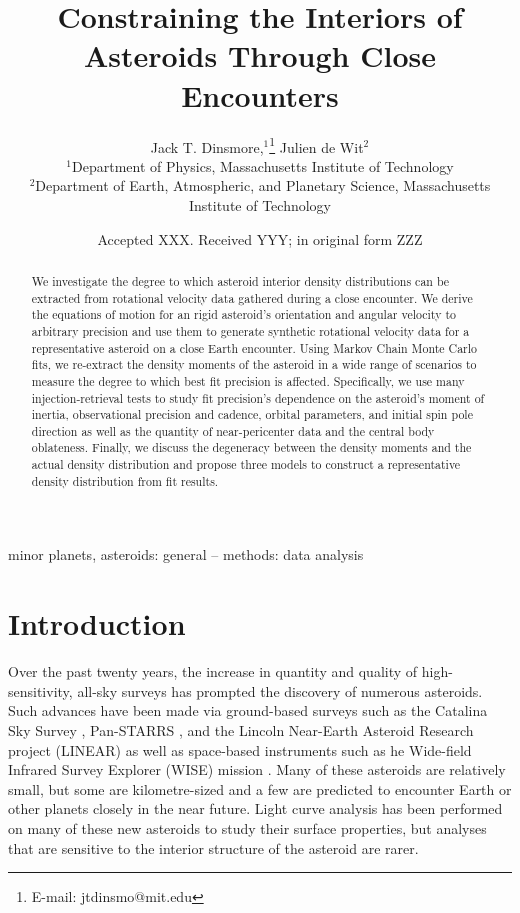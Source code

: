 \documentclass[fleqn,usenatbib]{mnras}
\title[Flyby Constraints on Asteroids Interiors]{Constraining the Interiors of Asteroids Through Close Encounters}
\author[Jack T. Dinsmore, Julien de Wit]{
Jack T. Dinsmore,$^{1}$\thanks{E-mail: jtdinsmo@mit.edu}
Julien de Wit$^{2}$
\\
$^{1}$Department of Physics, Massachusetts Institute of Technology\\
$^{2}$Department of Earth, Atmospheric, and Planetary Science, Massachusetts Institute of Technology
}
\date{Accepted XXX. Received YYY; in original form ZZZ}
\begin{document}
\label{firstpage}
\pagerange{\pageref{firstpage}--\pageref{lastpage}}
\maketitle

\begin{abstract}
  We investigate the degree to which asteroid interior density distributions can be extracted from rotational velocity data gathered during a close encounter. We derive the equations of motion for an rigid asteroid's orientation and angular velocity to arbitrary precision and use them to generate synthetic rotational velocity data for a representative asteroid on a close Earth encounter. Using Markov Chain Monte Carlo fits, we re-extract the density moments of the asteroid in a wide range of scenarios to measure the degree to which best fit precision is affected. Specifically, we use many injection-retrieval tests to study fit precision's dependence on the asteroid's moment of inertia, observational precision and cadence, orbital parameters, and initial spin pole direction as well as the quantity of near-pericenter data and the central body oblateness. Finally, we discuss the degeneracy between the density moments and the actual density distribution and propose three models to construct a representative density distribution from fit results.
\end{abstract}

\begin{keywords}
  minor planets, asteroids: general -- methods: data analysis
\end{keywords}



\section{Introduction}

Over the past twenty years, the increase in quantity and quality of high-sensitivity, all-sky surveys has prompted the discovery of numerous asteroids. Such advances have been made via ground-based surveys such as the Catalina Sky Survey \cite{larson1998catalina}, Pan-STARRS \cite{kaiser2002pan}, and the Lincoln Near-Earth Asteroid Research project (LINEAR) \cite{stokes2000lincoln} as well as space-based instruments such as he Wide-field Infrared Survey Explorer (WISE) mission \cite{wright2010wide}. Many of these asteroids are relatively small, but some are kilometre-sized and a few are predicted to encounter Earth or other planets closely in the near future. Light curve analysis has been performed on many of these new asteroids to study their surface properties, but analyses that are sensitive to the interior structure of the asteroid are rarer.
\end{document}
